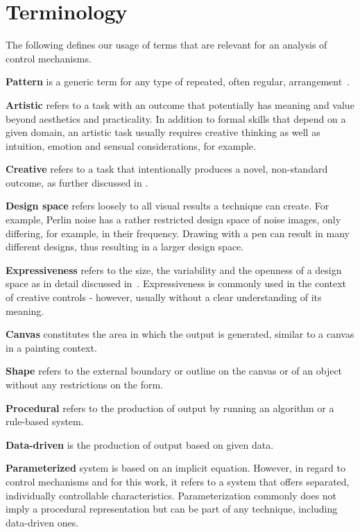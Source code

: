 
\section{Terminology}\label{terminology}
The following defines our usage of terms that are relevant for an analysis of control mechanisms. 

\textbf{Pattern} is a generic term for any type of repeated, often regular, arrangement~\cite{oed_2017}.


\textbf{Artistic} refers to a task with an outcome that potentially has meaning and value beyond aesthetics and practicality. In addition to formal skills that depend on a given domain, an artistic task usually requires creative thinking as well as intuition, emotion and sensual considerations, for example.

\textbf{Creative} refers to a task that intentionally produces a novel, non-standard outcome, as further discussed in . 

\textbf{Design space} refers loosely to all visual results a technique can create. For example, Perlin noise has a rather restricted design space of noise images, only differing, for example, in their frequency. Drawing with a pen can result in many different designs, thus resulting in a larger design space.

\textbf{Expressiveness} refers to the size, the variability and the openness of a design space as in detail discussed in~. Expressiveness is commonly used in the context of creative controls - however, usually without a clear understanding of its meaning.

\textbf{Canvas} constitutes the area in which the output is generated, similar to a canvas in a painting context.

\textbf{Shape} refers to the external boundary or outline on the canvas or of an object without any restrictions on the form. 

\textbf{Procedural} refers to the production of output by running an algorithm or a rule-based system.

\textbf{Data-driven} is the production of output based on given data.

\textbf{Parameterized} system is based on an implicit equation. However, in regard to control mechanisms and for this work, it refers to a system that offers separated, individually controllable characteristics. Parameterization commonly does not imply a procedural representation but can be part of any technique, including data-driven ones.